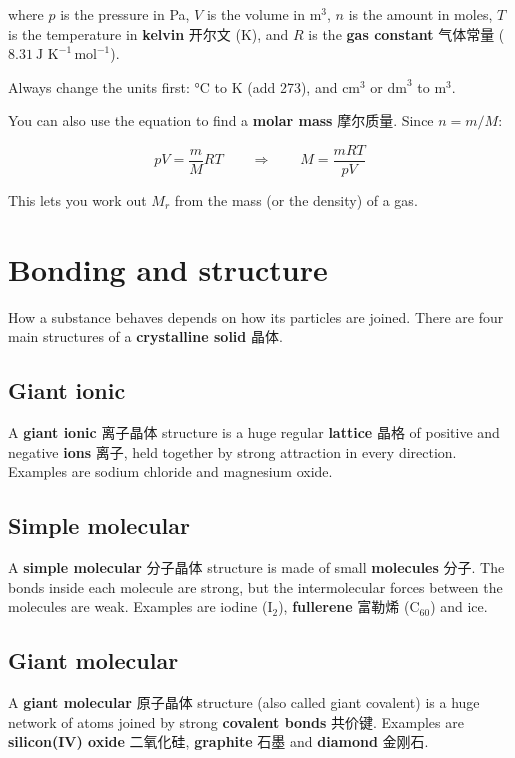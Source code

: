 \documentclass[11pt]{article}
\begin{document}
where $p$ is the pressure in Pa, $V$ is the volume in $\text{m}^3$, $n$ is the amount in moles, $T$ is the temperature in \textbf{kelvin} 开尔文 (K), and $R$ is the \textbf{gas constant} 气体常量 ($8.31\ \text{J K}^{-1}\,\text{mol}^{-1}$).

Always change the units first: °C to K (add 273), and $\text{cm}^3$ or $\text{dm}^3$ to $\text{m}^3$.

You can also use the equation to find a \textbf{molar mass} 摩尔质量. Since $n = m/M$:

\[
pV = \frac{m}{M}RT \qquad\Rightarrow\qquad M = \frac{mRT}{pV}
\]

This lets you work out $M_r$ from the mass (or the density) of a gas.

\section*{Bonding and structure}

How a substance behaves depends on how its particles are joined. There are four main structures of a \textbf{crystalline solid} 晶体.

\subsection*{Giant ionic}

A \textbf{giant ionic} 离子晶体 structure is a huge regular \textbf{lattice} 晶格 of positive and negative \textbf{ions} 离子, held together by strong attraction in every direction. Examples are sodium chloride and magnesium oxide.

\subsection*{Simple molecular}

A \textbf{simple molecular} 分子晶体 structure is made of small \textbf{molecules} 分子. The bonds inside each molecule are strong, but the intermolecular forces between the molecules are weak. Examples are iodine ($\text{I}_2$), \textbf{fullerene} 富勒烯 ($\text{C}_{60}$) and ice.

\subsection*{Giant molecular}

A \textbf{giant molecular} 原子晶体 structure (also called giant covalent) is a huge network of atoms joined by strong \textbf{covalent bonds} 共价键. Examples are \textbf{silicon(IV) oxide} 二氧化硅, \textbf{graphite} 石墨 and \textbf{diamond} 金刚石.
\end{document}
